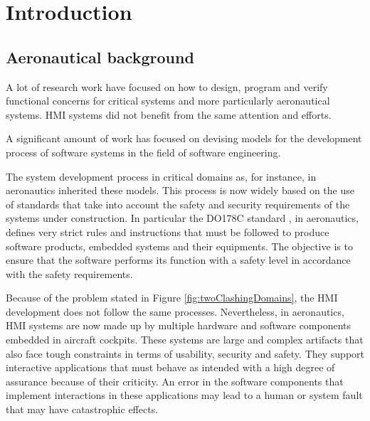 \documentclass[10pt]{sigplanconf}
\begin{document}



\section{Introduction}


\subsection{Aeronautical background}

A lot  of research  work have  focused on how  to design,  program and
verify functional concerns for  critical systems and more particularly
aeronautical  systems.  HMI   systems  did   not   benefit  from   the
same  attention   and efforts. 

A significant  amount of work has  focused on devising models  for the
development  process of  software  systems in  the  field of  software
engineering.

The system development  process in critical domains  as, for instance,
in aeronautics  inherited these  models.  This  process is  now widely
based on  the use of standards  that take into account  the safety and
security  requirements   of  the   systems  under   construction.   In
particular the DO178C  standard \cite{DO178C}, in aeronautics, defines
very strict  rules and instructions  that must be followed  to produce
software  products,  embedded  systems   and  their  equipments.   The
objective is to ensure that the  software performs its function with a
safety level in accordance with the safety requirements.

Because of the problem stated in Figure \ref{fig:twoClashingDomains}, the HMI development does not  follow the same processes. Nevertheless,
in aeronautics, HMI  systems are now made up by  multiple hardware and
software components embedded in  aircraft cockpits.  These systems are
large and complex artifacts that  also face tough constraints in terms
of  usability,   security  and   safety.   They   support  interactive
applications  that must  behave  as  intended with  a  high degree  of
assurance  because  of their  criticity.   An  error in  the  software
components that implement interactions  in these applications may lead
to a human or system fault that may have catastrophic effects.  
\end{document}
